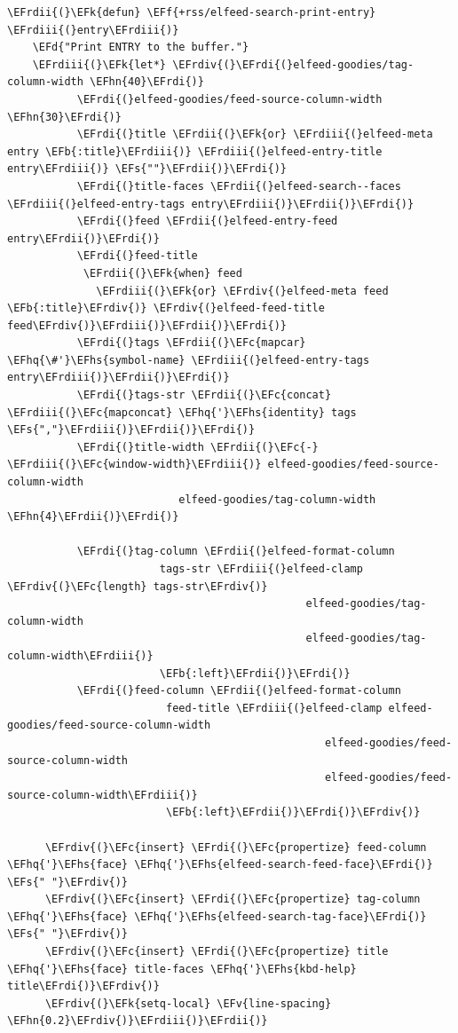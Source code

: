 \documentclass{scrartcl}
\newcommand{\EFk}[1]{\textcolor{EFk}{#1}} %
\newcommand{\EFd}[1]{\textcolor{EFd}{#1}} %
\newcommand{\EFs}[1]{\textcolor{EFs}{#1}} %
\newcommand{\EFb}[1]{\textcolor{EFb}{#1}} %
\newcommand{\EFc}[1]{\textcolor{EFc}{#1}} %
\newcommand{\EFv}[1]{\textcolor{EFv}{#1}} %
\newcommand{\EFf}[1]{\textcolor{EFf}{#1}} %
\newcommand{\EFhn}[1]{#1} %
\newcommand{\EFhq}[1]{#1} %
\newcommand{\EFhs}[1]{#1} %
\newcommand{\EFrdi}[1]{#1} %
\newcommand{\EFrdii}[1]{#1} %
\newcommand{\EFrdiii}[1]{#1} %
\newcommand{\EFrdiv}[1]{#1} %
\begin{document}
\begin{Code}
\begin{Verbatim}[]
  \EFrdii{(}\EFk{defun} \EFf{+rss/elfeed-search-print-entry} \EFrdiii{(}entry\EFrdiii{)}
    \EFd{"Print ENTRY to the buffer."}
    \EFrdiii{(}\EFk{let*} \EFrdiv{(}\EFrdi{(}elfeed-goodies/tag-column-width \EFhn{40}\EFrdi{)}
           \EFrdi{(}elfeed-goodies/feed-source-column-width \EFhn{30}\EFrdi{)}
           \EFrdi{(}title \EFrdii{(}\EFk{or} \EFrdiii{(}elfeed-meta entry \EFb{:title}\EFrdiii{)} \EFrdiii{(}elfeed-entry-title entry\EFrdiii{)} \EFs{""}\EFrdii{)}\EFrdi{)}
           \EFrdi{(}title-faces \EFrdii{(}elfeed-search--faces \EFrdiii{(}elfeed-entry-tags entry\EFrdiii{)}\EFrdii{)}\EFrdi{)}
           \EFrdi{(}feed \EFrdii{(}elfeed-entry-feed entry\EFrdii{)}\EFrdi{)}
           \EFrdi{(}feed-title
            \EFrdii{(}\EFk{when} feed
              \EFrdiii{(}\EFk{or} \EFrdiv{(}elfeed-meta feed \EFb{:title}\EFrdiv{)} \EFrdiv{(}elfeed-feed-title feed\EFrdiv{)}\EFrdiii{)}\EFrdii{)}\EFrdi{)}
           \EFrdi{(}tags \EFrdii{(}\EFc{mapcar} \EFhq{\#'}\EFhs{symbol-name} \EFrdiii{(}elfeed-entry-tags entry\EFrdiii{)}\EFrdii{)}\EFrdi{)}
           \EFrdi{(}tags-str \EFrdii{(}\EFc{concat} \EFrdiii{(}\EFc{mapconcat} \EFhq{'}\EFhs{identity} tags \EFs{","}\EFrdiii{)}\EFrdii{)}\EFrdi{)}
           \EFrdi{(}title-width \EFrdii{(}\EFc{-} \EFrdiii{(}\EFc{window-width}\EFrdiii{)} elfeed-goodies/feed-source-column-width
                           elfeed-goodies/tag-column-width \EFhn{4}\EFrdii{)}\EFrdi{)}

           \EFrdi{(}tag-column \EFrdii{(}elfeed-format-column
                        tags-str \EFrdiii{(}elfeed-clamp \EFrdiv{(}\EFc{length} tags-str\EFrdiv{)}
                                               elfeed-goodies/tag-column-width
                                               elfeed-goodies/tag-column-width\EFrdiii{)}
                        \EFb{:left}\EFrdii{)}\EFrdi{)}
           \EFrdi{(}feed-column \EFrdii{(}elfeed-format-column
                         feed-title \EFrdiii{(}elfeed-clamp elfeed-goodies/feed-source-column-width
                                                  elfeed-goodies/feed-source-column-width
                                                  elfeed-goodies/feed-source-column-width\EFrdiii{)}
                         \EFb{:left}\EFrdii{)}\EFrdi{)}\EFrdiv{)}

      \EFrdiv{(}\EFc{insert} \EFrdi{(}\EFc{propertize} feed-column \EFhq{'}\EFhs{face} \EFhq{'}\EFhs{elfeed-search-feed-face}\EFrdi{)} \EFs{" "}\EFrdiv{)}
      \EFrdiv{(}\EFc{insert} \EFrdi{(}\EFc{propertize} tag-column \EFhq{'}\EFhs{face} \EFhq{'}\EFhs{elfeed-search-tag-face}\EFrdi{)} \EFs{" "}\EFrdiv{)}
      \EFrdiv{(}\EFc{insert} \EFrdi{(}\EFc{propertize} title \EFhq{'}\EFhs{face} title-faces \EFhq{'}\EFhs{kbd-help} title\EFrdi{)}\EFrdiv{)}
      \EFrdiv{(}\EFk{setq-local} \EFv{line-spacing} \EFhn{0.2}\EFrdiv{)}\EFrdiii{)}\EFrdii{)}


\end{Verbatim}
\end{Code}
\end{document}

